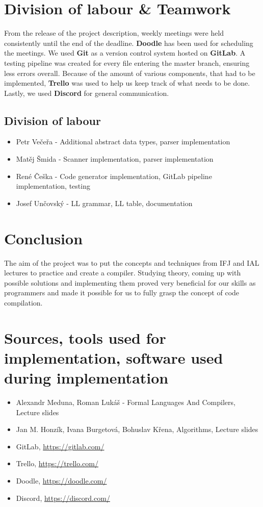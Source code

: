 \documentclass{article}
\begin{document}
\section{Division of labour \& Teamwork}
From the release of the project description, weekly meetings were held consistently until the end of the deadline. \textbf{Doodle} has been used for scheduling the meetings. We used \textbf{Git} as a version control system hosted on \textbf{GitLab}. A testing pipeline was created for every file entering the master branch, ensuring less errors overall. Because of the amount of various components, that had to be implemented, \textbf{Trello} was used to help us keep track of what needs to be done. Lastly, we used \textbf{Discord} for general communication.
\newpage
\subsection{Division of labour}
\begin{itemize}
    \item Petr Večeřa - Additional abstract data types, parser implementation
    \item Matěj Šmida - Scanner implementation, parser implementation
    \item René Češka - Code generator implementation, GitLab pipeline implementation, testing
    \item Josef Unčovský - LL grammar, LL table, documentation
\end{itemize}
\section{Conclusion}
The aim of the project was to put the concepts and techniques from IFJ and IAL lectures to practice and create a compiler. Studying theory, coming up with possible solutions and implementing them proved very beneficial for our skills as programmers and made it possible for us to fully grasp the concept of code compilation.
\section{Sources, tools used for implementation, software used during implementation}
\begin{itemize}
    \item Alexandr Meduna, Roman Lukáš - Formal Languages And Compilers, Lecture slides
    \item Jan M. Honzík, Ivana Burgetová, Bohuslav Křena, Algorithms, Lecture slides
    \item GitLab, \href{https://gitlab.com/}{https://gitlab.com/}
    \item Trello, \href{https://trello.com/}{https://trello.com/}
    \item Doodle, \href{https://doodle.com/}{https://doodle.com/}
    \item Discord, \href{https://discord.com/}{https://discord.com/}
\end{itemize}
\end{document}
